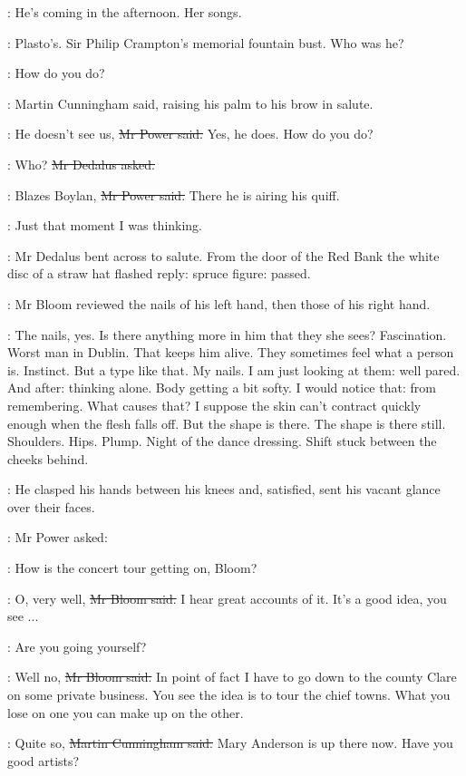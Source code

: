 \BloomInt:
He's coming in the afternoon.
Her songs.

\BloomInt:
Plasto's.
Sir Philip Crampton's memorial fountain bust.
Who was he?

\cunningham:
How do you do?

:
Martin Cunningham said,
raising his palm to his brow in salute.

\power:
He doesn't see us,
\sout{Mr Power said.}
Yes, he does.
How do you do?

\simon:
Who?
\sout{Mr Dedalus asked.}

\power:
Blazes Boylan,
\sout{Mr Power said.}
There he is airing his quiff.

\BloomInt:
Just that moment I was thinking.

:
Mr Dedalus bent across to salute.
From the door of the Red Bank the white disc of a straw hat flashed reply:
spruce figure:
passed.

:
Mr Bloom reviewed the nails of his left hand,
then those of his right hand.

\BloomInt:
The nails, yes.
Is there anything more in him that they she sees?
Fascination.
Worst man in Dublin.
That keeps him alive.
They sometimes feel what a person is.
Instinct.
But a type like that.
My nails.
I am just looking at them:
well pared.
And after:
thinking alone.
Body getting a bit softy.
I would notice that:
from remembering.
What causes that?
I suppose the skin can't contract quickly enough when the flesh falls off.
But the shape is there.
The shape is there still.
Shoulders.
Hips.
Plump.
Night of the dance dressing.
Shift stuck between the cheeks behind.

:
He clasped his hands between his knees
and, satisfied,
sent his vacant glance
over their faces.

:
Mr Power asked:

\power:
How is the concert tour getting on, Bloom?

\Bloom:
O, very well,
\sout{Mr Bloom said.}
I hear great accounts of it.
It's a good idea, you see ...

\power:
Are you going yourself?

\Bloom:
Well no,
\sout{Mr Bloom said.}
In point of fact
I have to go down to the county Clare on some private business.
You see the idea is to tour the chief towns.
What you lose on one
you can make up on the other.

\cunningham:
Quite so,
\sout{Martin Cunningham said.}
Mary Anderson is up there now.
Have you
good artists?

